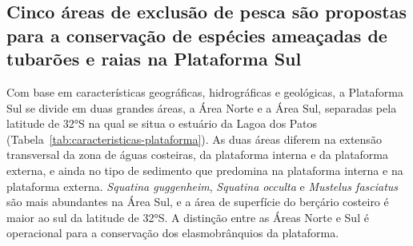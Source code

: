 \documentclass[a4paper,11pt,twoside,showtrims,onecolumn,openright,final]{memoir}
\begin{document}
\subsection*{Cinco áreas de exclusão de pesca são propostas para a conservação 
             de espécies ameaçadas de tubarões e raias na Plataforma Sul}

Com base em características geográficas, hidrográficas e geológicas, a Plataforma Sul 
se divide em duas grandes áreas, a Área Norte e a  Área Sul, separadas pela latitude 
de 32°S na qual se situa o estuário da Lagoa dos Patos (Tabela~\ref{tab:caracteristicas-plataforma}). 
As duas áreas diferem na extensão transversal da zona de águas costeiras, da plataforma 
interna e da plataforma externa, e ainda no tipo de sedimento que predomina na plataforma 
interna  e na plataforma externa. \emph{Squatina guggenheim}, \emph{Squatina occulta} e \emph{Mustelus fasciatus} 
são mais abundantes na Área Sul, e a área de superfície do berçário costeiro é maior ao sul 
da latitude de 32°S. A distinção entre as Áreas Norte e Sul é operacional para a conservação 
dos elasmobrânquios da plataforma.

\end{document}

